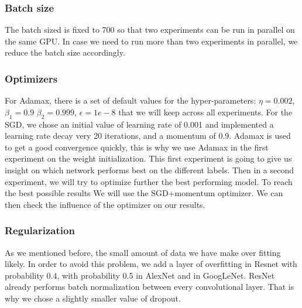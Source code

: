\subsubsection{Batch size}
The batch sized is fixed to 700 so that two experiments can be run in parallel on the same GPU. In case we need to run more than two experiments in parallel, we reduce the batch size accordingly.

\subsubsection{Optimizers}
For Adamax, there is a set of default values for the hyper-parameters: \(\eta = 0.002\), \(\beta_1 = 0.9\) \(\beta_2 = 0.999\), \(\epsilon = 1e-8\) that we will keep across all experiments.
For the SGD, we chose an initial value of learning rate of 0.001 and implemented a learning rate decay very 20 iterations, and a momentum of 0.9. 
Adamax is used to get a good convergence quickly, this is why we use Adamax in the first experiment on the weight initialization. This first experiment is going to give us insight on which network performs best on the different labels. Then in a second experiment, we will try to optimize further the best performing model. To reach the best possible results We will use the SGD+momentum optimizer.  We can then check the influence of the optimizer on our results.

\subsubsection{Regularization}
As we mentioned before, the small amount of data we have make over fitting likely. In order to avoid this problem, we add a layer of overfitting in Resnet with probability 0.4, with probability 0.5 in AlexNet and in GoogLeNet. ResNet already performs batch normalization between every convolutional layer. That is why we chose a slightly smaller value of dropout. 